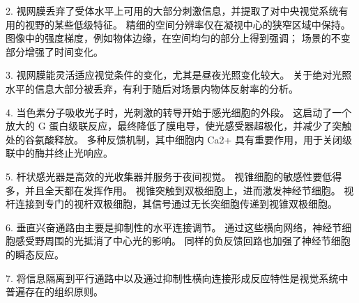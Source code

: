 2. 视网膜丢弃了受体水平上可用的大部分刺激信息，并提取了对中央视觉系统有用的视野的某些低级特征。
精细的空间分辨率仅在凝视中心的狭窄区域中保持。
图像中的强度梯度，例如物体边缘，在空间均匀的部分上得到强调；
场景的不变部分增强了时间变化。


3. 视网膜能灵活适应视觉条件的变化，尤其是昼夜光照变化较大。
关于绝对光照水平的信息大部分被丢弃，有利于随后对场景内物体反射率的分析。 


4. 当色素分子吸收光子时，光刺激的转导开始于感光细胞的外段。
这启动了一个放大的 G 蛋白级联反应，最终降低了膜电导，使光感受器超极化，并减少了突触处的谷氨酸释放。 
多种反馈机制，其中细胞内 Ca2+ 具有重要作用，用于关闭级联中的酶并终止光响应。 


5. 杆状感光器是高效的光收集器并服务于夜间视觉。
视锥细胞的敏感性要低得多，并且全天都在发挥作用。
视锥突触到双极细胞上，进而激发神经节细胞。
视杆连接到专门的视杆双极细胞，其信号通过无长突细胞传递到视锥双极细胞。 


6. 垂直兴奋通路由主要是抑制性的水平连接调节。
通过这些横向网络，神经节细胞感受野周围的光抵消了中心光的影响。
同样的负反馈回路也加强了神经节细胞的瞬态反应。


7. 将信息隔离到平行通路中以及通过抑制性横向连接形成反应特性是视觉系统中普遍存在的组织原则。


